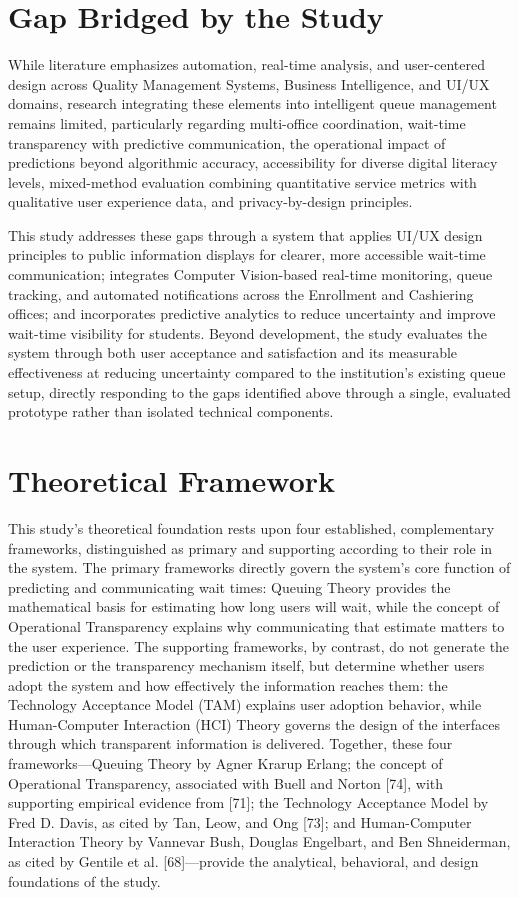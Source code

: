 \documentclass{research}
\begin{document}
\section{Gap Bridged by the Study}
While literature emphasizes automation, real-time analysis, and user-centered design across Quality Management Systems, Business Intelligence, and UI/UX domains, research integrating these elements into intelligent queue management remains limited, particularly regarding multi-office coordination, wait-time transparency with predictive communication, the operational impact of predictions beyond algorithmic accuracy, accessibility for diverse digital literacy levels, mixed-method evaluation combining quantitative service metrics with qualitative user experience data, and privacy-by-design principles.

This study addresses these gaps through a system that applies UI/UX design principles to public information displays for clearer, more accessible wait-time communication; integrates Computer Vision-based real-time monitoring, queue tracking, and automated notifications across the Enrollment and Cashiering offices; and incorporates predictive analytics to reduce uncertainty and improve wait-time visibility for students. Beyond development, the study evaluates the system through both user acceptance and satisfaction and its measurable effectiveness at reducing uncertainty compared to the institution's existing queue setup, directly responding to the gaps identified above through a single, evaluated prototype rather than isolated technical components.

\section{Theoretical Framework}
This study's theoretical foundation rests upon four established, complementary frameworks, distinguished as primary and supporting according to their role in the system. The primary frameworks directly govern the system's core function of predicting and communicating wait times: Queuing Theory provides the mathematical basis for estimating how long users will wait, while the concept of Operational Transparency explains why communicating that estimate matters to the user experience. The supporting frameworks, by contrast, do not generate the prediction or the transparency mechanism itself, but determine whether users adopt the system and how effectively the information reaches them: the Technology Acceptance Model (TAM) explains user adoption behavior, while Human-Computer Interaction (HCI) Theory governs the design of the interfaces through which transparent information is delivered. Together, these four frameworks—Queuing Theory by Agner Krarup Erlang; the concept of Operational Transparency, associated with Buell and Norton [74], with supporting empirical evidence from [71]; the Technology Acceptance Model by Fred D. Davis, as cited by Tan, Leow, and Ong [73]; and Human-Computer Interaction Theory by Vannevar Bush, Douglas Engelbart, and Ben Shneiderman, as cited by Gentile et al. [68]—provide the analytical, behavioral, and design foundations of the study.
\end{document}
